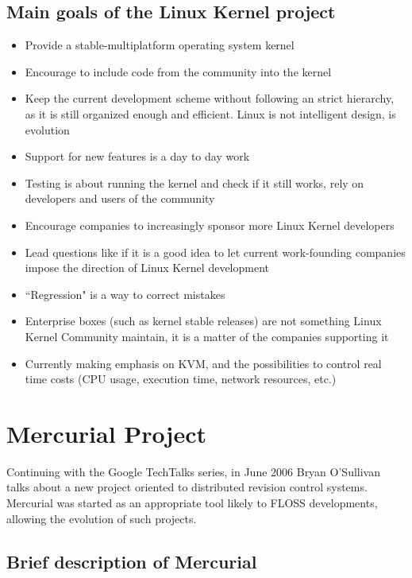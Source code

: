 \documentclass[11pt]{article} %
\begin{document}
\subsection{Main goals of the Linux Kernel project}

  	\begin{itemize}
  	  \item Provide a stable-multiplatform operating system kernel
  	  \item Encourage to include code from the community into the kernel
  	  \item Keep the current development scheme without following an strict hierarchy, as it is still organized enough and efficient. Linux is not intelligent design, is evolution
  	  \item Support for new features is a day to day work
  	  \item Testing is about running the kernel and check if it still works, rely on developers and users of the community
  	  \item Encourage companies to increasingly sponsor more Linux Kernel developers
  	  \item Lead questions like if it is a good idea to let current work-founding companies impose the direction of Linux Kernel development
  	  \item ``Regression" is a way to correct mistakes
  	  \item Enterprise boxes (such as kernel stable releases) are not something Linux Kernel Community maintain, it is a matter of the companies supporting it
  	  \item Currently making emphasis on KVM, and the possibilities to control real time costs (CPU usage, execution time, network resources, etc.)
  	\end{itemize}

\section{Mercurial Project}

Continuing with the Google TechTalks series, in June 2006 Bryan O'Sullivan talks about a new project oriented to distributed revision control systems. Mercurial was started as an appropriate tool likely to FLOSS developments, allowing the evolution of such projects.

\subsection{Brief description of Mercurial}
\end{document}
